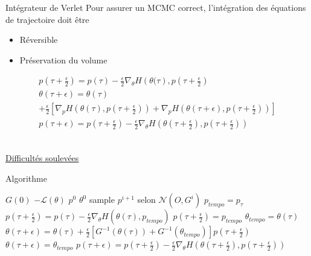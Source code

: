 \documentclass{beamer}
\begin{document}
  \begin{frame}{Intégrateur de Verlet}
	Pour assurer un MCMC correct, l'intégration des équations de trajectoire doit être	
	\begin{itemize}
	\item Réversible
	\item Préservation du volume
	\end{itemize}
	
	\begin{align*}
p\left(\tau +\frac{\epsilon}{2}\right)=p\left(\tau\right)-\frac{\epsilon}{2}\nabla_\theta H\left(\theta(\tau\right),p\left(\tau +\frac{\epsilon}{2}\right) \\
\theta(\tau +\epsilon)=\theta(\tau)\\
+\frac{\epsilon}{2}\left[	\nabla_p H\left(\theta\left(\tau\right),p\left(\tau+\frac{\epsilon}{2}\right)\right)+ \nabla_p H\left(\theta\left(\tau+\epsilon\right), p\left(\tau+\frac{\epsilon}{2}\right)\right)\right]\\
p(\tau+\epsilon)=p\left(\tau+\frac{\epsilon}{2}\right)-\frac{\epsilon}{2}\nabla_\theta H\left(\theta\left(\tau+\frac{\epsilon}{2}\right),p\left(\tau+\frac{\epsilon}{2}\right)\right)
	\end{align*}
	
	\begin{align*}
	\end{align*}
	
	\underline{Difficultés soulevées}
  \end{frame}	  
      
  
  \begin{frame}{Algorithme}
  

\begin{algorithmic}
\REQUIRE $G(0)$ $-\mathcal{L}(\theta)$ $p^0$ $\theta^0$
{}
\STATE sample $p^{i+1}$ selon $\mathcal{N}(O,G^i)$
\STATE $p_{tempo}=p_\tau$
\STATE $p\left(\tau +\frac{\epsilon}{2}\right)=p\left(\tau\right)-\frac{\epsilon}{2}\nabla_\theta H\left(\theta(\tau),p_{tempo}\right)$
\ENDFOR
\STATE $p\left(\tau +\frac{\epsilon}{2}\right) =p_{tempo}$
\STATE $\theta_{tempo}=\theta(\tau)$
\STATE $\theta(\tau +\epsilon)=\theta(\tau)+\frac{\epsilon}{2}\left[G^{-1}\left(\theta(\tau)\right)+G^{-1}\left(\theta_{tempo}\right)\right]p\left(\tau+\frac{\epsilon}{2}\right)$
\ENDFOR
\STATE $\theta(\tau+\epsilon)=\theta_{tempo}$
\STATE $p(\tau+\epsilon)=p\left(\tau+\frac{\epsilon}{2}\right)-\frac{\epsilon}{2}\nabla_\theta H\left(\theta\left(\tau+\frac{\epsilon}{2}\right),p\left(\tau+\frac{\epsilon}{2}\right)\right)$
\ENDFOR
\ENDFOR
\end{algorithmic}

  \end{frame}
  
\end{document}
